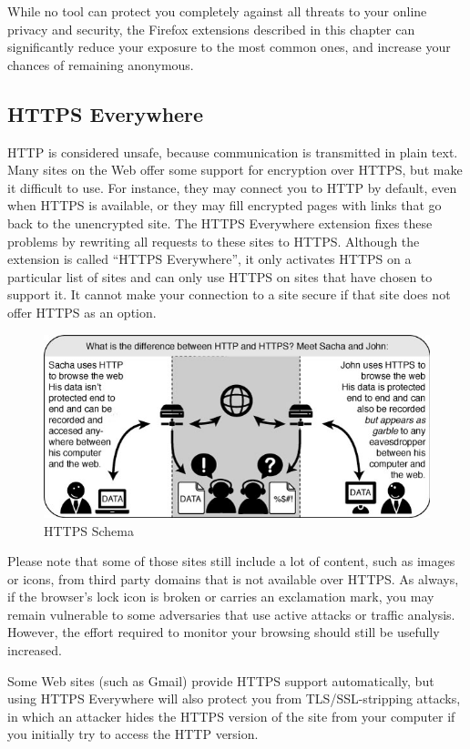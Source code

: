 While no tool can protect you completely against all threats to your
online privacy and security, the Firefox extensions described in this
chapter can significantly reduce your exposure to the most common ones,
and increase your chances of remaining anonymous.

\subsection{HTTPS Everywhere}

HTTP is considered unsafe, because communication is transmitted in plain
text. Many sites on the Web offer some support for encryption over
HTTPS, but make it difficult to use. For instance, they may connect you
to HTTP by default, even when HTTPS is available, or they may fill
encrypted pages with links that go back to the unencrypted site. The
HTTPS Everywhere extension fixes these problems by rewriting all
requests to these sites to HTTPS. Although the extension is called
``HTTPS Everywhere'', it only activates HTTPS on a particular list of
sites and can only use HTTPS on sites that have chosen to support it. It
cannot make your connection to a site secure if that site does not offer
HTTPS as an option.

\begin{figure}[htbp]
\centering
\includegraphics{https_schema.jpg}
\caption{HTTPS Schema}
\end{figure}

Please note that some of those sites still include a lot of content,
such as images or icons, from third party domains that is not available
over HTTPS. As always, if the browser's lock icon is broken or carries
an exclamation mark, you may remain vulnerable to some adversaries that
use active attacks or traffic analysis. However, the effort required to
monitor your browsing should still be usefully increased.

Some Web sites (such as Gmail) provide HTTPS support automatically, but
using HTTPS Everywhere will also protect you from TLS/SSL-stripping
attacks, in which an attacker hides the HTTPS version of the site from
your computer if you initially try to access the HTTP version.

